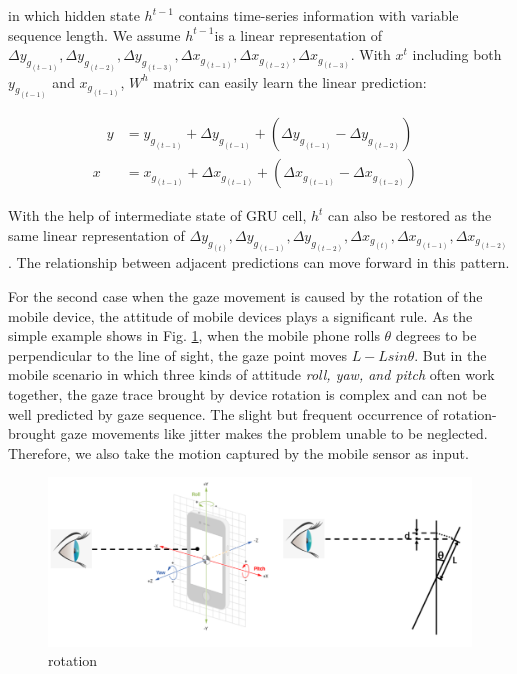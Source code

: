 \documentclass[acmlarge]{acmart}
\begin{document}
in which hidden state $h^{t-1}$ contains time-series information with variable sequence length. We assume $h^{t-1}$is a linear representation of $\Delta y_{g_{(t-1)}}, \Delta y_{g_{(t-2)}}, \Delta y_{g_{(t-3)}}, \Delta x_{g_{(t-1)}}, \Delta x_{g_{(t-2)}}, \Delta x_{g_{(t-3)}}$. With $x^t$ including both $y_{g_{(t-1)}}$ and $x_{g_{(t-1)}}$,  $W^h$ matrix can easily learn the linear prediction:

\begin{equation}
\begin{aligned}
\quad y &= y_{g_{(t-1)}} + \Delta y_{g_{(t-1)}} + (\Delta y_{g_{(t-1)}} - \Delta y_{g_{(t-2)}})\quad \\
x &= x_{g_{(t-1)}} + \Delta x_{g_{(t-1)}} +(\Delta x_{g_{(t-1)}} - \Delta x_{g_{(t-2)}})
\end{aligned}
\end{equation}

With the help of intermediate state of GRU cell, $h^t$ can also be restored as the same linear representation of   $\Delta y_{g_{(t)}}, \Delta y_{g_{(t-1)}}, \Delta y_{g_{(t-2)}}, \Delta x_{g_{(t)}}, \Delta x_{g_{(t-1)}}, \Delta x_{g_{(t-2)}}$.  The relationship between adjacent predictions can move forward in this pattern.

For the second case when the gaze movement is caused by the rotation of the mobile device, the attitude of mobile devices plays a significant rule. As the simple example shows in Fig. \ref{rotation}, when the mobile phone rolls $\theta$ degrees to be perpendicular to the line of sight, the gaze point moves $L - Lsin\theta$. But in the mobile scenario in which three kinds of attitude \textit{roll, yaw, and pitch} often work together, the gaze trace brought by device rotation is complex and can not be well predicted by gaze sequence. The slight but frequent occurrence of rotation-brought gaze movements like jitter makes the problem unable to be neglected. Therefore, we also take the motion captured by the mobile sensor as input.

\begin{figure}
  \centering
  \includegraphics[scale=0.4]{pictures/rotation_model.png}
  \caption{rotation}
  \label{rotation}
\end{figure}
\end{document}
